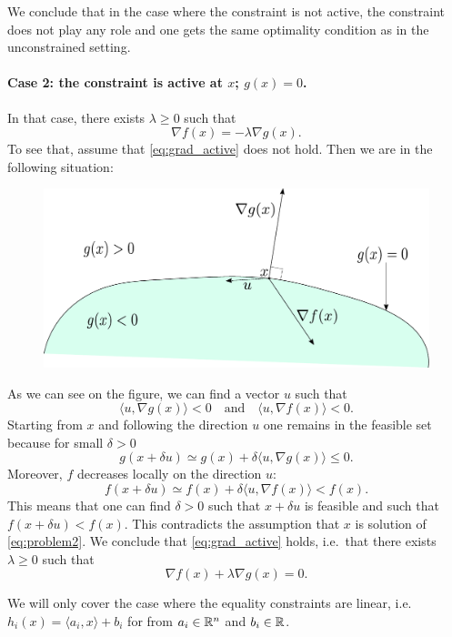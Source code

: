 \documentclass[11pt,nocut]{article}
\begin{document}
We conclude that in the case where the constraint is not active, the constraint does not play any role and one gets the same optimality condition as in the unconstrained setting.

\paragraph{Case 2: the constraint is active at $x$; $g(x) = 0$.}
In that case, there exists $\lambda \geq 0$ such that 
\begin{equation}\label{eq:grad_active}
	\nabla f(x) = - \lambda \nabla g(x).
\end{equation}
To see that, assume that \eqref{eq:grad_active} does not hold. Then we are in the following situation:
\begin{figure}[h!]
	\begin{center}
		\includegraphics[width=0.8\linewidth]{figures/absurd.pdf}
	\end{center}
\end{figure}

As we can see on the figure, we can find a vector $u$ such that
$$
\langle u, \nabla g(x) \rangle < 0 
\quad \text{and} \quad
\langle u, \nabla f(x) \rangle < 0.
$$
Starting from $x$ and following the direction $u$ one remains in the feasible set because for small $\delta >0$
$$
g(x + \delta u) \simeq g(x) + \delta \langle u, \nabla g(x) \rangle \leq 0.
$$
Moreover, $f$ decreases locally on the direction $u$:
$$
f(x + \delta u) \simeq f(x) + \delta \langle u, \nabla f(x) \rangle < f(x).
$$
This means that one can find $\delta > 0$ such that $x + \delta u$ is feasible and such that $f(x + \delta u) < f(x)$. This contradicts the assumption that $x$ is solution of \eqref{eq:problem2}.
We conclude that \eqref{eq:grad_active} holds, i.e.\ that there exists $\lambda \geq 0$ such that
$$
\nabla f(x) + \lambda \nabla g(x) = 0.
$$

We will only cover the case where the equality constraints are linear, i.e. $h_i(x) = \langle a_i, x \rangle + b_i$ for from $a_i \in \mathbb{R}^n$ and $b_i \in \mathbb{R}$.
\end{document}
